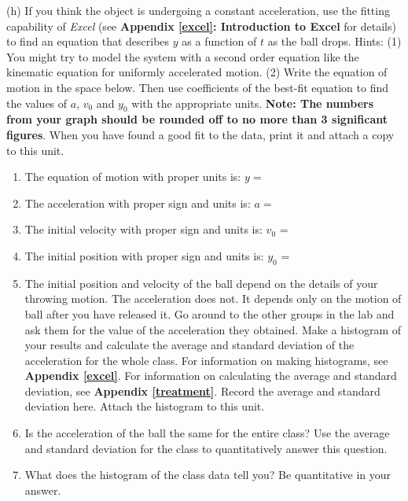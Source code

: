 (h) If you think the object is undergoing a constant acceleration, use the fitting capability of \textit{Excel} (see \textbf{Appendix \ref{excel}: Introduction to
Excel} for details) to find an equation that describes $y$ as a function
of $t$ as the ball drops. Hints: (1) You might try to model the system with a
second order equation like the kinematic equation for uniformly accelerated
motion. (2) Write the equation of motion in the space below. Then use coefficients of the best-fit equation to find the values of $a$, \( v_{0} \) and \( y_{0} \) with the appropriate units. \textbf{Note: The numbers from your graph should be rounded off to no more than 3 significant figures}. When you have found a good fit to the data, print it and attach a copy to this unit. 

\begin{enumerate}
\item The equation of motion with proper units is: $y =$\vspace{5mm}

\item The acceleration with proper sign and units is: $a =$ \vspace{5mm}

\item The initial velocity with proper sign and units is: \(v_{0} \) = \vspace{5mm}

\item The initial position with proper sign and units is: \(y_{0} \) = \vspace{5mm}

\item The initial position and velocity of the ball depend on the details of your throwing motion. 
The acceleration does not.
It depends only on the motion of ball after you have released it.
Go around to the other groups in the lab and ask them for the value of the acceleration they obtained.
Make a histogram of your results and calculate the average and standard deviation of the acceleration for the whole class.
For information on making histograms, see \textbf{Appendix \ref{excel}}. For information on calculating the average and
standard deviation, see \textbf{Appendix \ref{treatment}}. Record the average and standard deviation here.
Attach the histogram to this unit.
\vspace{20mm}

\item Is the acceleration of the ball the same for the entire class? Use the average and standard deviation for the class to quantitatively answer this question.
\vspace{20mm}

\item What does the histogram of the class data tell you? Be quantitative in your answer.
\vspace{20mm}

\end{enumerate}
